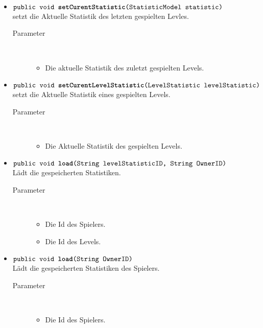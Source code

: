 \begin{description}
\begin{itemize}
		\item $\texttt{public void \textbf{setCurentStatistic}(StatisticModel statistic)}$ \\ setzt die Aktuelle Statistik des  letzten gespielten Levles.
				\begin{description}
					\item[Parameter] \hfill \\
					\vspace{-.8cm}
					\begin{itemize}
						\item Die aktuelle Statistik des zuletzt gespielten Levels.
					\end{itemize}
				\end{description}
		\item $\texttt{public void \textbf{setCurentLevelStatistic}(LevelStatistic levelStatistic)}$ \\ setzt die Aktuelle Statistik eines gespielten Levels.
				\begin{description}
					\item[Parameter] \hfill \\
					\vspace{-.8cm}
					\begin{itemize}
						\item Die Aktuelle Statistik  des  gespielten Levels.
					\end{itemize}
				\end{description}
				\item $\texttt{public void \textbf{load}(String levelStatisticID, String OwnerID)}$ \\ Lädt die gespeicherten Statistiken.
				\begin{description}
					\item[Parameter] \hfill \\
					\vspace{-.8cm}
					\begin{itemize}
						\item Die Id des Spielers.
						\item Die Id des Levels.
					\end{itemize}
				\end{description}
				\item $\texttt{public void \textbf{load}(String OwnerID)}$ \\ Lädt die gespeicherten Statistiken des Spielers.
				\begin{description}
					\item[Parameter] \hfill \\
					\vspace{-.8cm}
					\begin{itemize}
						\item Die Id des Spielers.
					\end{itemize}
				\end{description}
				

\end{itemize}
\end{description}
